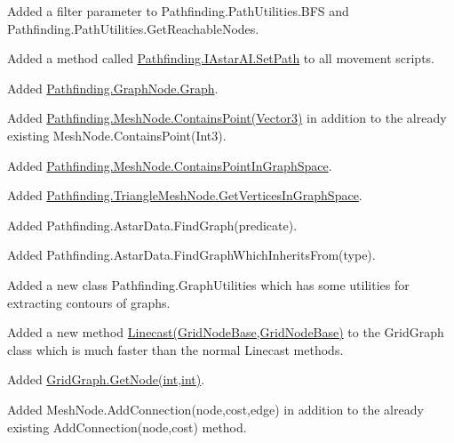 \begin{DoxyItemize}
\begin{DoxyItemize}
\begin{DoxyItemize}
\item Added a \textquotesingle{}filter\textquotesingle{} parameter to Pathfinding.\+Path\+Utilities.\+B\+FS and Pathfinding.\+Path\+Utilities.\+Get\+Reachable\+Nodes.
\item Added a method called \mbox{\hyperlink{interface_pathfinding_1_1_i_astar_a_i_a86eb322f611af919dad08b78e580edf4}{Pathfinding.\+I\+Astar\+A\+I.\+Set\+Path}} to all movement scripts.
\item Added \mbox{\hyperlink{class_pathfinding_1_1_graph_node_a0b534d78dbe2883face936a71cd76634}{Pathfinding.\+Graph\+Node.\+Graph}}.
\item Added \mbox{\hyperlink{class_pathfinding_1_1_mesh_node_aba387fc0f2e90ab2a5621f9ac9fa8790}{Pathfinding.\+Mesh\+Node.\+Contains\+Point(\+Vector3)}} in addition to the already existing Mesh\+Node.\+Contains\+Point(\+Int3).
\item Added \mbox{\hyperlink{class_pathfinding_1_1_mesh_node_af8c133b4f9c3baf713a6fe8cd41d2fa4}{Pathfinding.\+Mesh\+Node.\+Contains\+Point\+In\+Graph\+Space}}.
\item Added \mbox{\hyperlink{class_pathfinding_1_1_triangle_mesh_node_a8b7af27c9d4ebebeaf7720a36f34870c}{Pathfinding.\+Triangle\+Mesh\+Node.\+Get\+Vertices\+In\+Graph\+Space}}.
\item Added Pathfinding.\+Astar\+Data.\+Find\+Graph(predicate).
\item Added Pathfinding.\+Astar\+Data.\+Find\+Graph\+Which\+Inherits\+From(type).
\item Added a new class Pathfinding.\+Graph\+Utilities which has some utilities for extracting contours of graphs.
\item Added a new method \mbox{\hyperlink{}{Linecast(\+Grid\+Node\+Base,\+Grid\+Node\+Base)}} to the Grid\+Graph class which is much faster than the normal Linecast methods.
\item Added \mbox{\hyperlink{class_pathfinding_1_1_grid_graph_a0b612dc43efba20fe974711022552a7f}{Grid\+Graph.\+Get\+Node(int,int)}}.
\item Added Mesh\+Node.\+Add\+Connection(node,cost,edge) in addition to the already existing Add\+Connection(node,cost) method.

\end{DoxyItemize}
\end{DoxyItemize}
\end{DoxyItemize}
